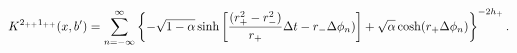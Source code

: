 \begin{equation} \label{lorpch}
K^{2_{++}1_{++}}(x,b') = \sum_{n=-\infty}^{\infty} \left\{ - \sqrt{1-\alpha}
\sinh\left[{(r_+^2 - r_-^2) \over r_+}
\Delta t - r_- \Delta \phi_n) \right] + \sqrt{\alpha} \cosh( r_+
\Delta \phi_n) \right\}^{-2h_+}.
\end{equation}

